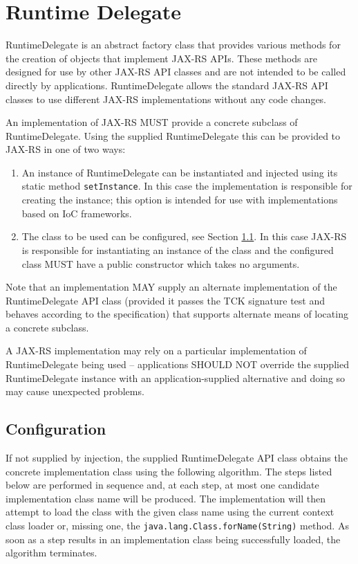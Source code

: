 \chapter{Runtime Delegate}
\label{runtimedelegate}

RuntimeDelegate is an abstract factory class that provides various methods for the creation of objects that implement
JAX-RS APIs. These methods are designed for use by other JAX-RS API classes and are not intended to be called directly
by applications. RuntimeDelegate allows the standard JAX-RS API classes to use different JAX-RS implementations without
any code changes.

An implementation of JAX-RS MUST provide a concrete subclass of RuntimeDelegate. Using the supplied RuntimeDelegate this
can be provided to JAX-RS in one of two ways:

\begin{enumerate}
    \item An instance of RuntimeDelegate can be instantiated and injected using its static method
    \lstinline{setInstance}. In this case the implementation is responsible for creating the instance; this option is
    intended for use with implementations based on IoC frameworks.
    \item The class to be used can be configured, see Section \ref{rdconfig}. In this case JAX-RS is responsible for
    instantiating an instance of the class and the configured class MUST have a public constructor which takes no
    arguments.
\end{enumerate}

Note that an implementation MAY supply an alternate implementation of the RuntimeDelegate API class (provided it passes
the TCK signature test and behaves according to the specification) that supports alternate means of locating a concrete
subclass.

A JAX-RS implementation may rely on a particular implementation of RuntimeDelegate being used -- applications SHOULD NOT
override the supplied RuntimeDelegate instance with an application-supplied alternative and doing so may cause
unexpected problems.

\section{Configuration}\label{rdconfig}

If not supplied by injection, the supplied RuntimeDelegate API class obtains the concrete implementation class using the
following algorithm. The steps listed below are performed in sequence and, at each step, at most one candidate
implementation class name will be produced. The implementation will then attempt to load the class with the given class
name using the current context class loader or, missing one, the \lstinline{java.lang.Class.forName(String)} method. As
soon as a step results in an implementation class being successfully loaded, the algorithm terminates.

